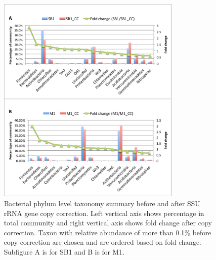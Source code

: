 \documentclass[12pt]{article}
\begin{document}
\begin{figure}[tbph!]
  \centering
  \includegraphics[width=0.8\textwidth]{figs/SB1+M1_cc}
  \caption[Taxonomy summary before and after SSU rRNA gene copy correction]{Bacterial phylum level taxonomy summary before and after SSU rRNA gene copy correction. Left vertical axis shows percentage in total community and right vertical axis shows fold change after copy correction. Taxon with relative abundance of more than 0.1\% before copy correction are chosen and are ordered based on fold change. Subfigure A is for SB1 and B is for M1.}
  \label{fig:SB1+M1_cc}
\end{figure}
\end{document}
